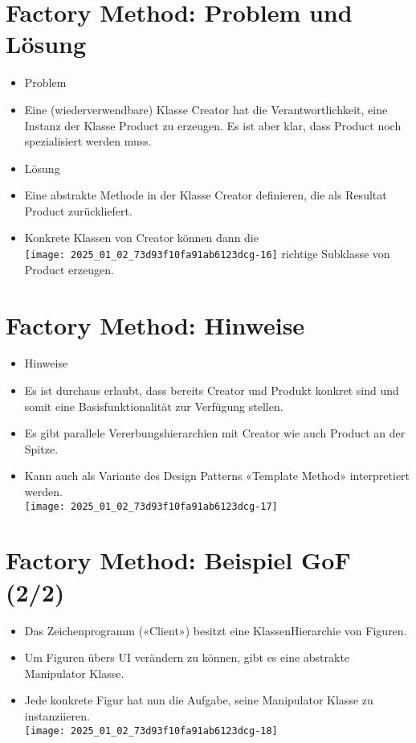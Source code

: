 \section*{Factory Method: Problem und Lösung}
\begin{itemize}
  \item Problem
  \item Eine (wiederverwendbare) Klasse Creator hat die Verantwortlichkeit, eine Instanz der Klasse Product zu erzeugen. Es ist aber klar, dass Product noch spezialisiert werden muss.
  \item Lösung
  \item Eine abstrakte Methode in der Klasse Creator definieren, die als Resultat Product zurückliefert.
  \item Konkrete Klassen von Creator können dann die\\
\texttt{[image: 2025\_01\_02\_73d93f10fa91ab6123dcg-16]} richtige Subklasse von Product erzeugen.
\end{itemize}

\section*{Factory Method: Hinweise}
\begin{itemize}
  \item Hinweise
  \item Es ist durchaus erlaubt, dass bereits Creator und Produkt konkret sind und somit eine Basisfunktionalität zur Verfügung stellen.
  \item Es gibt parallele Vererbungshierarchien mit Creator wie auch Product an der Spitze.
  \item Kann auch als Variante des Design Patterns «Template Method» interpretiert werden.\\
\texttt{[image: 2025\_01\_02\_73d93f10fa91ab6123dcg-17]}
\end{itemize}

\section*{Factory Method: Beispiel GoF (2/2)}
\begin{itemize}
  \item Das Zeichenprogramm («Client») besitzt eine KlassenHierarchie von Figuren.
  \item Um Figuren übers UI verändern zu können, gibt es eine abstrakte Manipulator Klasse.
  \item Jede konkrete Figur hat nun die Aufgabe, seine Manipulator Klasse zu instanziieren.\\
\texttt{[image: 2025\_01\_02\_73d93f10fa91ab6123dcg-18]}
\end{itemize}

